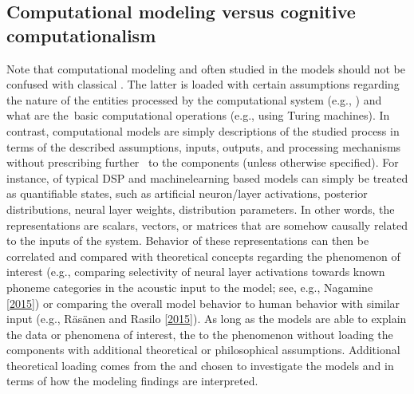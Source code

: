 \documentclass[letterpaper,10pt,english]{jupyterBook}
\begin{document}
\subsection{Computational modeling versus cognitive computationalism}
\label{\detokenize{Computational_models_of_human_language_processing:computational-modeling-versus-cognitive-computationalism}}
\sphinxAtStartPar
Note that computational modeling and  often studied in
the models should not be confused with classical
.
The latter is loaded with certain assumptions regarding the nature of
the entities processed by the computational system (e.g., ) and what are the basic computational
operations (e.g.,  using Turing machines). In
contrast, computational models are simply descriptions of the studied
process in terms of the described assumptions, inputs, outputs, and
processing mechanisms without prescribing further  to the
components (unless otherwise specified). For instance, 
of typical DSP and machine\sphinxhyphen{}learning \sphinxhyphen{}based models can simply be treated
as quantifiable states, such as artificial neuron/layer activations,
posterior distributions, neural layer weights, distribution parameters.
In other words, the representations are scalars, vectors, or matrices
that are somehow causally related to the inputs of the system. Behavior
of these representations can then be correlated and compared with
theoretical concepts regarding the phenomenon of interest (e.g.,
comparing selectivity of neural layer activations towards known phoneme
categories in the acoustic input to the model; see, e.g., Nagamine  {[}\hyperlink{cite.References:id23}{2015}{]}) or comparing the overall model behavior to human behavior
with similar input (e.g., Räsänen and Rasilo {[}\hyperlink{cite.References:id19}{2015}{]}). As long as the models
are able to explain the data or phenomena of interest, the  to the phenomenon without
loading the components with additional theoretical or philosophical
assumptions. Additional theoretical loading comes from the  and
 chosen to investigate the models and in terms of
how the modeling findings are interpreted.
\end{document}
